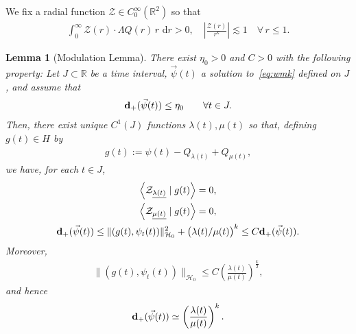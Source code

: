 \documentclass[10pt,reqno]{amsart}
\def\cZ {\mathcal{Z}}
\newcommand{\uln}[1]{{\underline{ #1 }}}
\newcommand{\E}{\mathcal{E}}
\newcommand{\HH}{\mathcal{H}}
\newcommand{\ZZ}{\mathcal{Z}}
\newcommand{\R}{\mathbb{R}}
\newcommand{\la}{\lambda}
\newcommand{\La}{\Lambda}
\newcommand{\U}{\underline}
\newcommand{\ang}[1]{\left\langle{#1}\right\rangle}
\newcommand{\abs}[1]{\left\lvert{#1}\right\rvert}
\newcommand{\EQ}[1]{\begin{equation}\begin{split} #1 \end{split}\end{equation}}
\numberwithin{equation}{section}
\newtheorem{lem}[thm]{Lemma}
\theoremstyle{remark}
\newcommand{\mand}{{\ \ \text{and} \ \  }}
\newcommand{\dr}{\, \mathrm{d}r}
\newcommand{\0}{\emptyset}
\newcommand{\eps}{\epsilon}
\newcommand{\bfd}{{\bf d}}
\begin{document}

We fix a radial function $\ZZ \in C^{\infty}_0(\R^2)$ so that 
\EQ{ \label{eq:ZZdef} 
\int_0^\infty  \ZZ(r)  \cdot \La Q(r) \,  r \, \dr >0, \quad \abs{ \frac{\ZZ(r)}{r^k}} \lesssim 1  \quad  \forall \, r \le 1. 
}
%
%

\begin{lem}[Modulation Lemma]  \label{l:modeq} There exist $\eta_0>0$ and $C > 0$
 with the following property:   Let $J\subset \R$ be a time interval, $\vec \psi(t)$ a solution to~\eqref{eq:wmk} defined on $J$,  and assume that
 \EQ{
 \bfd_+(\vec\psi(t)) \leq \eta_0\qquad \forall t\in J.
 }
 Then, there exist unique $C^1(J)$ functions $\la(t), \mu(t)$ so that, defining $g(t) \in H$ by
\EQ{ \label{eq:gdef1} 
g(t):= \psi(t) - Q_{\la(t)} + Q_{\mu(t)} , 
}
we have, for each $t \in J$,
\begin{gather} 
\ang{ \cZ_{\uln{\lambda(t)}} \mid  g(t)}  = 0  \label{eq:ola},   \\
\ang{\ZZ_{\uln{\mu(t)}} \mid g(t) } = 0  \label{eq:omu},  \\
\bfd_+(\vec \psi(t)) \le \| (g(t), \psi_t(t)) \|_{\HH_0}^2 +\big(\lambda(t)/\mu(t)\big)^k \le C \bfd_+(\vec\psi(t))\label{eq:gdotgd} . 
\end{gather} 
Moreover, 
\begin{align} 
\| (g(t), \psi_t(t) ) \|_{\HH_0} \le C\left( \frac{\la(t)}{\mu(t)} \right)^{\frac{k}{2}} \label{eq:gH} , 
\end{align} 
and hence 
\EQ{ \label{eq:lamud1}
\bfd_+(\vec \psi(t)) \simeq \left( \frac{\la(t)}{\mu(t)} \right)^{k}. 
}
\end{lem} 
\end{document}
